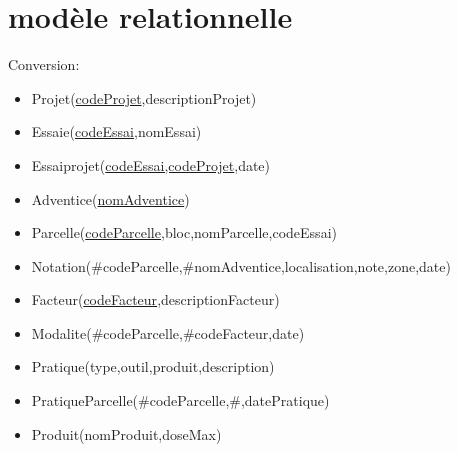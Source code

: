 \documentclass{article}
\begin{document}
\section{modèle relationnelle}
Conversion:\\
\begin{itemize}
  \item Projet(\underline{codeProjet},descriptionProjet)
  \item Essaie(\underline{codeEssai},nomEssai)
  \item Essaiprojet(\underline{codeEssai,codeProjet},date)
  \item Adventice(\underline{nomAdventice}) 
  \item Parcelle(\underline{codeParcelle},bloc,nomParcelle,codeEssai)
  \item Notation(\#codeParcelle,\#nomAdventice,localisation,note,zone,date)
  \item Facteur(\underline{codeFacteur},descriptionFacteur)
  \item Modalite(\#codeParcelle,\#codeFacteur,date)
  \item Pratique(type,outil,produit,description)
  \item PratiqueParcelle(\#codeParcelle,\#,datePratique)
  \item Produit(nomProduit,doseMax)
\end{itemize}






\end{document}
